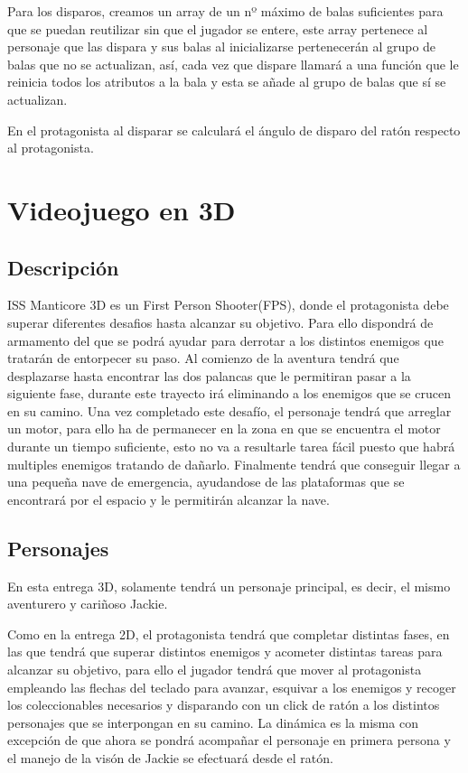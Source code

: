Para los disparos, creamos un array de un nº máximo de balas suficientes para que se puedan reutilizar sin que el jugador se entere, este array pertenece al personaje que las dispara y sus balas al inicializarse pertenecerán al grupo de balas que no se actualizan, así, cada vez que dispare llamará a una función que le reinicia todos los atributos a la bala y esta se añade al grupo de balas que sí se actualizan. 

En el protagonista al disparar se calculará el ángulo de disparo del ratón respecto al protagonista. 

\section{Videojuego en 3D}

\subsection{Descripción}
ISS Manticore 3D es un First Person Shooter(FPS), donde el protagonista debe superar diferentes desafios hasta alcanzar su objetivo. Para ello dispondrá de armamento del que se podrá ayudar para derrotar a los distintos enemigos que tratarán de entorpecer su paso. Al comienzo de la aventura tendrá que desplazarse hasta encontrar las dos palancas que le permitiran pasar a la siguiente fase, durante este trayecto irá eliminando a los enemigos que se crucen en su camino. Una vez completado este desafío, el personaje tendrá que arreglar un motor, para ello ha de permanecer en la zona en que se encuentra el motor durante un tiempo suficiente, esto no va a resultarle tarea fácil puesto que habrá multiples enemigos tratando de dañarlo. Finalmente tendrá que conseguir llegar a una pequeña nave de emergencia, ayudandose de las plataformas que se encontrará por el espacio y le permitirán alcanzar la nave. 

\subsection{Personajes}

En esta entrega 3D, solamente tendrá un personaje principal, es decir, el mismo aventurero y cariñoso Jackie.

Como en la entrega 2D, el protagonista tendrá que completar distintas fases, en las que tendrá que superar distintos enemigos y acometer distintas tareas para alcanzar su objetivo, para ello el jugador tendrá que mover al protagonista empleando las flechas del teclado para avanzar, esquivar a los enemigos y recoger los coleccionables necesarios y disparando con un click de ratón a los distintos personajes que se interpongan en su camino. La dinámica es la misma con excepción de que ahora se pondrá acompañar el personaje en primera persona y el manejo de la visón de Jackie se efectuará desde el ratón.

